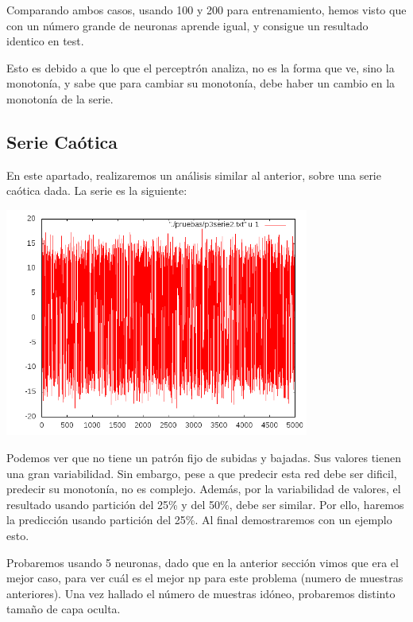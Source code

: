 \documentclass[12pt]{article}
\begin{document}
Comparando ambos casos, usando 100 y 200 para entrenamiento, hemos visto que con un número grande de neuronas aprende igual, y consigue un resultado identico en test.

Esto es debido a que lo que el perceptrón analiza, no es la forma que ve, sino la monotonía, y sabe que para cambiar su monotonía, debe haber un cambio en la monotonía de la serie.
\newpage
\subsection{Serie Caótica}

En este apartado, realizaremos un análisis similar al anterior, sobre una serie caótica dada. La serie es la siguiente:

\begin{center}
	\includegraphics[width=10cm]{serie_caotica}
\end{center}

Podemos ver que no tiene un patrón fijo de subidas y bajadas. Sus valores tienen una gran variabilidad. Sin embargo, pese a que predecir esta red debe ser dificil, predecir su monotonía, no es complejo. Además, por la variabilidad de valores, el resultado usando partición del 25\% y del 50\%, debe ser similar. Por ello, haremos la predicción usando partición del 25\%. Al final demostraremos con un ejemplo esto.

Probaremos usando 5 neuronas, dado que en la anterior sección vimos que era el mejor caso, para ver cuál es el mejor np para este problema (numero de muestras anteriores). Una vez hallado el número de muestras idóneo, probaremos distinto tamaño de capa oculta.
\end{document}
